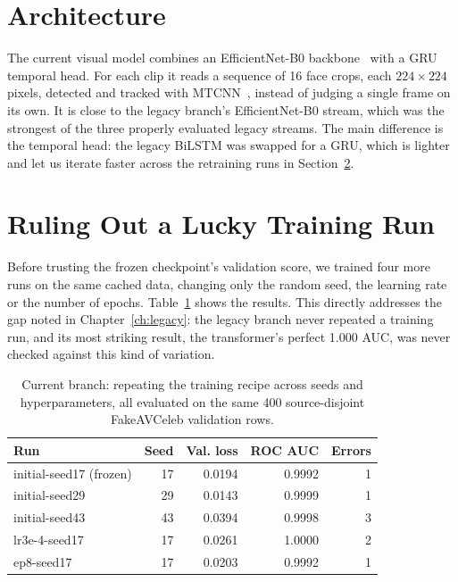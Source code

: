 \section{Architecture}

The current visual model combines an EfficientNet-B0
backbone~\cite{efficientnet} with a GRU temporal head. For each clip it reads
a sequence of 16 face crops, each $224\times224$ pixels, detected and tracked
with MTCNN~\cite{mtcnn}, instead of judging a single frame on its own. It is
close to the legacy branch's EfficientNet-B0 stream, which was the strongest of
the three properly evaluated legacy streams. The main difference is the
temporal head: the legacy BiLSTM was swapped for a GRU, which is lighter and
let us iterate faster across the retraining runs in
Section~\ref{sec:seed-repetition}.

\section{Ruling Out a Lucky Training Run}
\label{sec:seed-repetition}

Before trusting the frozen checkpoint's validation score, we trained four more
runs on the same cached data, changing only the random seed, the learning rate
or the number of epochs. Table~\ref{tab:seed-comparison} shows the results.
This directly addresses the gap noted in Chapter~\ref{ch:legacy}: the legacy
branch never repeated a training run, and its most striking result, the
transformer's perfect 1.000 AUC, was never checked against this kind of
variation.

\begin{table}[ht]
    \centering
    \caption{Current branch: repeating the training recipe across seeds and hyperparameters, all evaluated on the same 400 source-disjoint FakeAVCeleb validation rows.}
    \label{tab:seed-comparison}
    \begin{tabular}{lrrrr}
        \toprule
        \textbf{Run} & \textbf{Seed} & \textbf{Val. loss} & \textbf{ROC AUC} & \textbf{Errors} \\
        \midrule
        initial-seed17 (frozen) & 17 & 0.0194 & 0.9992 & 1 \\
        initial-seed29          & 29 & 0.0143 & 0.9999 & 1 \\
        initial-seed43          & 43 & 0.0394 & 0.9998 & 3 \\
        lr3e-4-seed17           & 17 & 0.0261 & 1.0000 & 2 \\
        ep8-seed17              & 17 & 0.0203 & 0.9992 & 1 \\
        \bottomrule
    \end{tabular}
\end{table}


